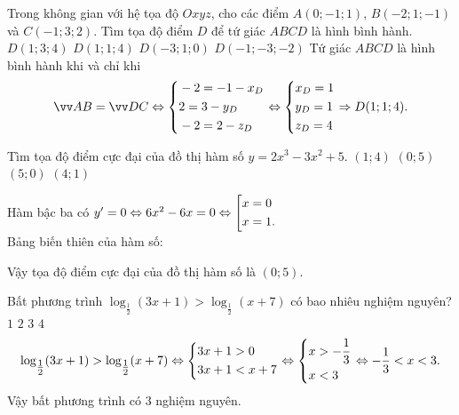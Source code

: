 \begin{ex}%
	Trong không gian với hệ tọa độ $Oxyz$, cho các điểm $A(0; -1; 1)$, $B(-2; 1; -1)$ và $C(-1; 3; 2)$. Tìm tọa độ điểm $D$ để tứ giác $ABCD$ là hình bình hành.
	\choice
	{$D(1; 3; 4)$}
	{\True $D(1; 1; 4)$}
	{$D(-3; 1; 0)$}
	{$D(-1; -3; -2)$}
	\loigiai
	{Tứ giác $ABCD$ là hình bình hành khi và chỉ khi
		$$\overrightarrow{AB}=\overrightarrow{DC}\Leftrightarrow\heva{&-2=-1-x_D\\&2=3-y_D\\&-2=2-z_D}\Leftrightarrow\heva{&x_D=1\\&y_D=1\\&z_D=4}\Rightarrow D(1; 1; 4).$$
	}
\end{ex}

\begin{ex}%
	Tìm tọa độ điểm cực đại của đồ thị hàm số $y=2x^3-3x^2+5$.
	\choice
	{$(1; 4)$}
	{\True $(0; 5)$}
	{$(5; 0)$}
	{$(4; 1)$}
	\loigiai
	{Hàm bậc ba có $y'=0\Leftrightarrow 6x^2-6x=0\Leftrightarrow\left[\begin{aligned}&x=0\\&x=1.\end{aligned}\right.$\\
		 Bảng biến thiên của hàm số:
		\begin{center}
		\end{center}
		Vậy tọa độ điểm cực đại của đồ thị hàm số là $(0; 5)$.
	}
\end{ex}

\begin{ex}%
	Bất phương trình $\log_{\tfrac{1}{2}}(3x+1)>\log_{\tfrac{1}{2}}(x+7)$ có bao nhiêu nghiệm nguyên?
	\choice
	{$1$}
	{$2$}
	{\True $3$}
	{$4$}
	\loigiai
	{$$\log_{\tfrac{1}{2}}(3x+1)>\log_{\tfrac{1}{2}}(x+7)\Leftrightarrow\left\{\begin{aligned}&3x+1>0\\&3x+1<x+7\end{aligned}\right.
		\Leftrightarrow\left\{\begin{aligned}&x>-\dfrac{1}{3}\\&x<3\end{aligned}\right.\Leftrightarrow -\dfrac{1}{3}<x<3.$$
		Vậy bất phương trình có $3$ nghiệm nguyên.
	}
\end{ex}

